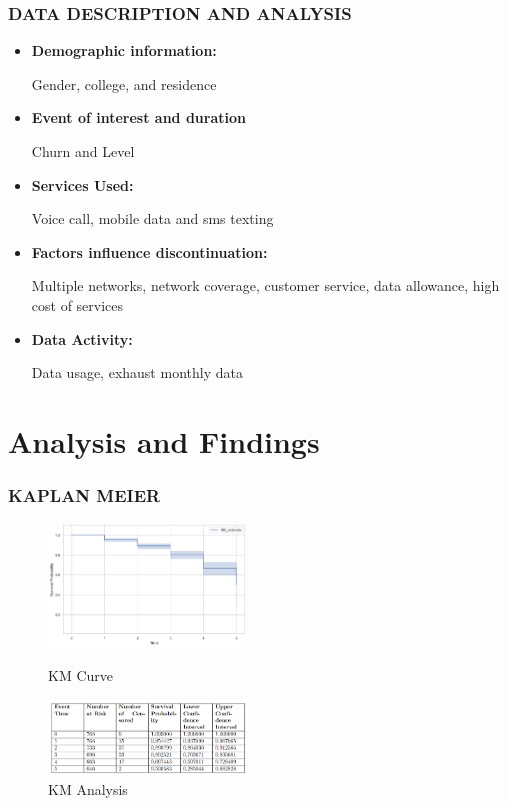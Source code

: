 \documentclass{beamer}
\begin{document}
	\begin{frame}
		\frametitle{DATA DESCRIPTION AND ANALYSIS}
		\begin{itemize}
			
			
			\item \textbf{Demographic information:}
			
			Gender, college, and residence
			\item \textbf{Event of interest and duration}
			
			Churn and Level
			\item \textbf{Services Used:}
			
			Voice call, mobile data and sms texting
			\item \textbf{Factors influence discontinuation: }
			
			Multiple networks, network coverage, customer service, data allowance, high cost of services
			\item \textbf{Data Activity:}
			
			Data usage, exhaust monthly data
		\end{itemize}
	\end{frame}
	
	
	
	\section{Analysis and Findings}
	\begin{frame}
		\frametitle{KAPLAN  MEIER}
		\begin{figure}[H]
			\centering
			\includegraphics[width=0.47\textwidth]{Figure 4/4.1.png}
			\hfill
			\caption{KM Curve}
			\label{Table 1}
			\includegraphics[width=0.47\textwidth]{Presentation/ana.png}
			
			\caption{KM Analysis}
			\label{Figure 1}
		\end{figure}
	\end{frame}
	
\end{document}

